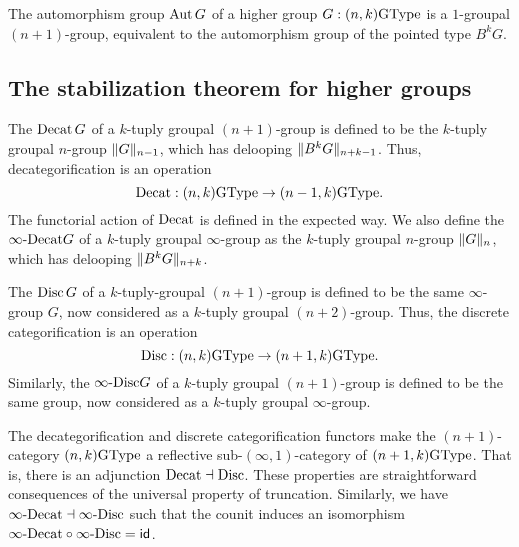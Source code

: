 \begin{cor}
The automorphism group $\Aut G$ of a higher group $G:(n,k)\GType$ is a $1$-groupal $(n+1)$-group, equivalent to the automorphism group of the pointed type $B^kG$.
\end{cor}

\subsection{The stabilization theorem for higher groups}
\label{sec:stabilization}

\begin{defn}
The  $\Decat G$ of a $k$-tuply groupal $(n+1)$-group is defined to be the $k$-tuply groupal $n$-group $\trunc{n-1}{G}$, which has delooping $\trunc{n+k-1}{B^kG}$. Thus, decategorification is an operation
\begin{equation*}
\Decat : (n,k)\GType \to (n-1,k)\GType.
\end{equation*}
The functorial action of $\Decat$ is defined in the expected way. We also define the  $\iDecat G$ of a $k$-tuply groupal $\infty$-group as the $k$-tuply groupal $n$-group $\trunc{n}{G}$, which has delooping $\trunc{n+k}{B^k G}$. 
\end{defn}

\begin{defn}
The  $\Disc G$ of a $k$-tuply-groupal $(n+1)$-group is defined to be the same $\infty$-group $G$, now considered as a $k$-tuply groupal $(n+2)$-group. Thus, the discrete categorification is an operation
\begin{equation*}
\Disc : (n,k)\GType \to (n+1,k)\GType.
\end{equation*}
Similarly, the  $\iDisc G$ of a $k$-tuply groupal $(n+1)$-group is defined to be the same group, now considered as a $k$-tuply groupal $\infty$-group.
\end{defn}

\begin{rmk}
The decategorification and discrete categorification functors make the $(n+1)$-category $(n,k)\GType$ a reflective sub-$(\infty,1)$-category of $(n+1,k)\GType$. That is, there is an adjunction ${\Decat} \dashv {\Disc}$. These properties are straightforward consequences of the universal property of truncation.
Similarly, we have ${\iDecat} \dashv {\iDisc}$ such that the counit induces an isomorphism ${\iDecat} \circ {\iDisc} = \idfunc$.
\end{rmk}

